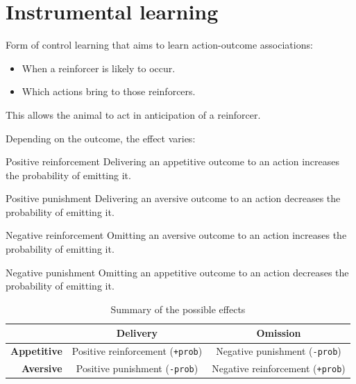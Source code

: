 \chapter{Instrumental learning}


Form of control learning that aims to learn action-outcome associations:
\begin{itemize}
    \item When a reinforcer is likely to occur.
    \item Which actions bring to those reinforcers.
\end{itemize}
This allows the animal to act in anticipation of a reinforcer.

Depending on the outcome, the effect varies:
\begin{descriptionlist}
    \item[Positive reinforcement] 
        Delivering an appetitive outcome to an action increases the probability of emitting it.

    \item[Positive punishment] 
        Delivering an aversive outcome to an action decreases the probability of emitting it.
    
    \item[Negative reinforcement] 
        Omitting an aversive outcome to an action increases the probability of emitting it.
    
    \item[Negative punishment] 
        Omitting an appetitive outcome to an action decreases the probability of emitting it.
\end{descriptionlist}

\begin{table}[H]
    \centering
    \begin{tabular}{r|cc}
        \toprule
                            & \textbf{Delivery}                         & \textbf{Omission} \\
        \midrule
        \textbf{Appetitive} & Positive reinforcement (\texttt{+prob})   & Negative punishment (\texttt{-prob}) \\
        \textbf{Aversive}   & Positive punishment (\texttt{-prob})      & Negative reinforcement (\texttt{+prob}) \\
        \bottomrule
    \end{tabular}
    \caption{Summary of the possible effects}
\end{table}



